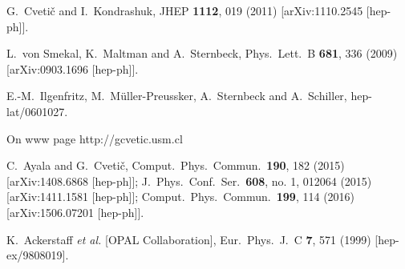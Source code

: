 \documentclass[3p,times,twocolumn]{elsarticle}
\begin{document}
\begin{thebibliography}{999}
  G.~Cveti\v{c} and I.~Kondrashuk,
  JHEP {\bf 1112}, 019 (2011)
  [arXiv:1110.2545 [hep-ph]].
  
  L.~von Smekal, K.~Maltman and A.~Sternbeck,
  Phys.\ Lett.\ B {\bf 681}, 336 (2009)
  [arXiv:0903.1696 [hep-ph]].
  
  E.-M.~Ilgenfritz, M.~M\"uller-Preussker, A.~Sternbeck and A.~Schiller,  
  hep-lat/0601027.

On www page http://gcvetic.usm.cl 

  C.~Ayala and G.~Cveti\v{c},
  Comput.\ Phys.\ Commun.\  {\bf 190}, 182 (2015)
  [arXiv:1408.6868 [hep-ph]];
  J.\ Phys.\ Conf.\ Ser.\  {\bf 608}, no. 1, 012064 (2015)
  [arXiv:1411.1581 [hep-ph]];
Comput.\ Phys.\ Commun.\  {\bf 199}, 114 (2016)
  [arXiv:1506.07201 [hep-ph]].

  K.~Ackerstaff {\it et al.} [OPAL Collaboration],
  Eur.\ Phys.\ J.\ C {\bf 7}, 571 (1999)
  [hep-ex/9808019].
 

\end{thebibliography}
\end{document}
